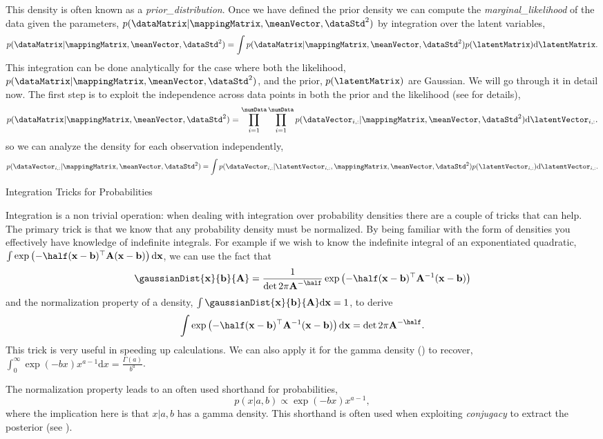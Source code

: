 This density is often known as a \emph{\gls{prior_distribution}}. Once we have defined the prior
density we can compute the \emph{\gls{marginal_likelihood}} of the data given the parameters,
$p(\dataMatrix|\mappingMatrix, \meanVector, \dataStd^2)$ by
integration over the latent variables,
\[
p(\dataMatrix|\mappingMatrix, \meanVector, \dataStd^2) = \int
p(\dataMatrix | \mappingMatrix, \meanVector,
\dataStd^2)p(\latentMatrix) \text{d}\latentMatrix.
\]
This integration can be done analytically for the case where both the
likelihood, $p(\dataMatrix| \mappingMatrix, \meanVector, \dataStd^2)$,
and the prior, $p(\latentMatrix)$ are Gaussian. We will go through it
in detail now. The first step is to exploit the independence across
data points in both the prior and the likelihood (see
 for details),
\[
p(\dataMatrix|\mappingMatrix, \meanVector, \dataStd^2) =
\prod_{i=1}^\numData \prod_{i=1}^\numData p(\dataVector_{i, :} |
\mappingMatrix, \meanVector, \dataStd^2) \text{d}\latentVector_{i,
  :}.
\]
so we can analyze the density for each observation independently,
\[
p(\dataVector_{i, :} | \mappingMatrix, \meanVector, \dataStd^2) = \int
p(\dataVector_{i, :}| \latentVector_{i, :}, \mappingMatrix,
\meanVector, \dataStd^2)p(\latentVector_{i, :})
\text{d}\latentVector_{i, :}.
\]
\begin{tipfloat}
  \caption{Integration Tricks for
    Probabilities} \label{tip:integrationTricks} 
  
  \boxfontsize Integration is a non trivial operation: when dealing
  with integration over probability densities there are a couple of
  tricks that can help. The primary trick is that we know that any
  probability density must be normalized. By being familiar with the
  form of densities you effectively have knowledge of indefinite
  integrals. For example if we wish to know the indefinite integral of
  an exponentiated quadratic, $\int \exp
  \left(-\half(\mathbf{x}-\mathbf{b})^\top \mathbf{A} (\mathbf{x}
    -\mathbf{b})\right)\text{d}\mathbf{x}$, we can use the fact that
  \[
  \gaussianDist{\mathbf{x}}{\mathbf{b}}{\mathbf{A}} =
  \frac{1}{\det{2\pi \mathbf{A}}^{-\half}}\exp
  \left(-\half(\mathbf{x}-\mathbf{b})^\top \mathbf{A}^{-1}
    (\mathbf{x} -\mathbf{b})\right)
  \]
  and the normalization property of a density, $\int
  \gaussianDist{\mathbf{x}}{\mathbf{b}}{\mathbf{A}}
  \text{d}\mathbf{x} = 1$, to derive
  \[
  \int \exp \left(-\half(\mathbf{x}-\mathbf{b})^\top
    \mathbf{A}^{-1} (\mathbf{x}
    -\mathbf{b})\right)\text{d}\mathbf{x} = \det{2\pi
    \mathbf{A}}^{-\half}.
  \]
  This trick is very useful in speeding up calculations. We can also
  apply it for the gamma density () to recover,
  $\int_{0}^{\infty} \exp(-bx)x^{a-1}\text{d}x =
  \frac{\Gamma(a)}{b^a}$.
  
  The normalization property leads to an often used shorthand for
  probabilities,
  \[
  p(x|a, b) \propto \exp(-bx)x^{a-1},
  \]
  where the implication here is that $x|a, b$ has a gamma
  density. This shorthand is often used when exploiting
  \emph{conjugacy} to extract the posterior (see
  ).
\end{tipfloat}



